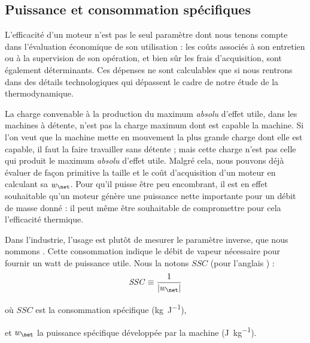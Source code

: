 	\subsection{Puissance et consommation spécifiques}
	\label{ch_SSC}
		
		L’efficacité d’un moteur n’est pas le seul paramètre dont nous tenons compte dans l’évaluation économique de son utilisation : les coûts associés à son entretien ou à la supervision de son opération, et bien sûr les frais d’acquisition, sont également déterminants. Ces dépenses ne sont calculables que si nous rentrons dans des détails technologiques qui dépassent le cadre de notre étude de la thermodynamique.
		
			\jecourte La charge convenable à la production du maximum \emph{absolu} d’effet utile, dans les machines à détente, n’est pas la charge maximum dont est capable la machine. \jecourte Si l’on veut que la machine mette en mouvement la plus grande charge dont elle est capable, il faut la faire travailler sans détente ; mais cette charge n’est pas celle qui produit le maximum \emph{absolu} d’effet utile.
		Malgré cela, nous pouvons déjà évaluer de façon primitive la taille et le coût d’acquisition d’un moteur en calculant sa  $w_\net$. Pour qu’il puisse être peu encombrant, il est en effet souhaitable qu’un moteur génère une puissance nette importante pour un débit de masse donné : il peut même être souhaitable de compromettre pour cela l’efficacité thermique.
			
		Dans l’industrie, l’usage est plutôt de mesurer le paramètre inverse, que nous nommons . Cette consommation indique le débit de vapeur nécessaire pour fournir un watt de puissance utile. Nous la notons $SSC$ (pour l’anglais ) :
		\begin{equation}
			\mathit{SSC} \equiv \frac{1}{|w_\net|}
		\end{equation}
		\begin{equationterms}
			\item où \tab $SSC$ 		\tab est la consommation spécifique (\si{\kilogram\per\joule}),
			\item et \tab $w_\net$ 	\tab la puissance spécifique développée par la machine (\si{\joule\per\kilogram}).
		\end{equationterms}

